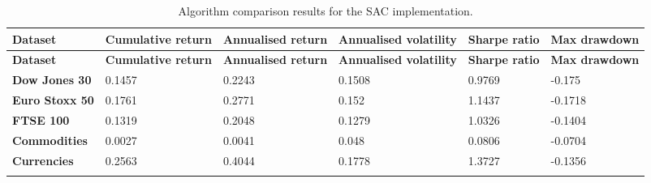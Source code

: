 \begin{longtable}{|l|p{2.1cm}|p{2.1cm}|p{2.1cm}|p{1.5cm}|p{2cm}|}
    \hline
    \textbf{Dataset} & \textbf{Cumulative return} & \textbf{Annualised return} & \textbf{Annualised volatility} & \textbf{Sharpe ratio} & \textbf{Max drawdown}  \\ \midrule
    \endfirsthead

    \hline
    \textbf{Dataset} & \textbf{Cumulative return} & \textbf{Annualised return} & \textbf{Annualised volatility} & \textbf{Sharpe ratio} & \textbf{Max drawdown}  \\ \midrule
    \endhead

    \endfoot
    \hline

    \textbf{Dow Jones 30} & 0.1457 & 0.2243 & 0.1508 & 0.9769 & -0.175 \\ \hline
    \textbf{Euro Stoxx 50} & 0.1761 & 0.2771 & 0.152 & 1.1437 & -0.1718 \\ \hline
    \textbf{FTSE 100} & 0.1319 & 0.2048 & 0.1279 & 1.0326 & -0.1404 \\ \hline
    \textbf{Commodities} & 0.0027 & 0.0041 & 0.048 & 0.0806 & -0.0704 \\ \hline
    \textbf{Currencies} & 0.2563 & 0.4044 & 0.1778 & 1.3727 & -0.1356 \\ \hline

    \caption{Algorithm comparison results for the SAC implementation.}
    \label{tab:experiment_algorithms_sac}
\end{longtable}